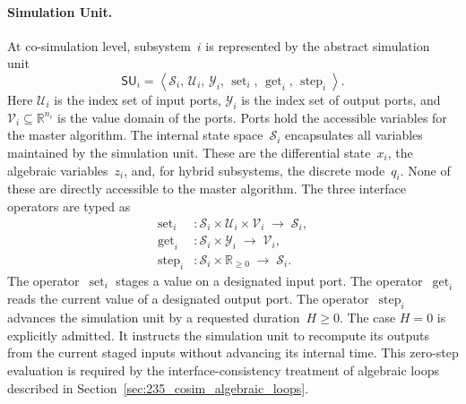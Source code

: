 \paragraph{Simulation Unit.}
\label{para:simulation_unit}
At co-simulation level, subsystem~$i$ is represented by the abstract simulation unit~\cite{gomes_co-simulation_2019,hansen_verification_2021}
\begin{equation}
    \mathsf{SU}_i =
    \left\langle
        \mathcal{S}_i,\,
        \mathcal{U}_i,\,
        \mathcal{Y}_i,\,
        \operatorname{set}_i,\,
        \operatorname{get}_i,\,
        \operatorname{step}_i
    \right\rangle.
    \label{eq:simulation_unit}
\end{equation}
Here $\mathcal{U}_i$ is the index set of input ports, $\mathcal{Y}_i$ is the index set of output ports, and $\mathcal{V}_i \subseteq \mathbb{R}^{n_i}$ is the value domain of the ports.
Ports hold the accessible variables for the master algorithm.
The internal state space~$\mathcal{S}_i$ encapsulates all variables maintained by the simulation unit.
These are the differential state~$x_i$, the algebraic variables~$z_i$, and, for hybrid subsystems, the discrete mode~$q_i$.
None of these are directly accessible to the master algorithm.
The three interface operators are typed as
\begin{align*}
    \operatorname{set}_i  &: \mathcal{S}_i \times \mathcal{U}_i \times \mathcal{V}_i
                             \;\to\; \mathcal{S}_i, \\
    \operatorname{get}_i  &: \mathcal{S}_i \times \mathcal{Y}_i
                             \;\to\; \mathcal{V}_i, \\
    \operatorname{step}_i &: \mathcal{S}_i \times \mathbb{R}_{\geq 0}
                             \;\to\; \mathcal{S}_i.
\end{align*}
The operator~$\operatorname{set}_i$ stages a value on a designated input port.
The operator~$\operatorname{get}_i$ reads the current value of a designated output port.
The operator~$\operatorname{step}_i$ advances the simulation unit by a requested duration~$H \geq 0$.
The case $H = 0$ is explicitly admitted.
It instructs the simulation unit to recompute its outputs from the current staged inputs without advancing its internal time.
This zero-step evaluation is required by the interface-consistency treatment of algebraic loops described in Section~\ref{sec:235_cosim_algebraic_loops}.

